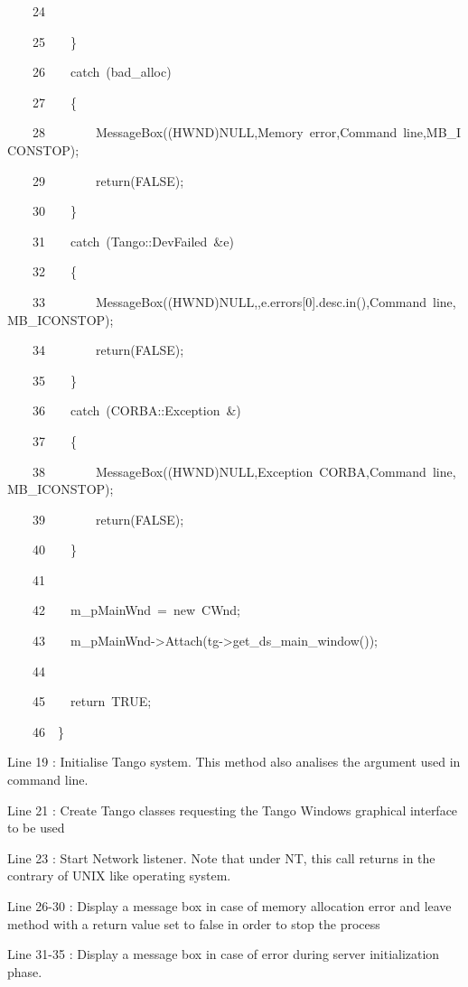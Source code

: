 \begin{lyxcode}
~~~~24~~

~~~~25~~~~\}

~~~~26~~~~catch~(bad\_alloc)

~~~~27~~~~\{

~~~~28~~~~~~~~MessageBox((HWND)NULL,\textquotedbl{}Memory~error\textquotedbl{},\textquotedbl{}Command~line\textquotedbl{},MB\_ICONSTOP);

~~~~29~~~~~~~~return(FALSE);

~~~~30~~~~\}

~~~~31~~~~catch~(Tango::DevFailed~\&e)

~~~~32~~~~\{

~~~~33~~~~~~~~MessageBox((HWND)NULL,,e.errors{[}0{]}.desc.in(),\textquotedbl{}Command~line\textquotedbl{},MB\_ICONSTOP);

~~~~34~~~~~~~~return(FALSE);

~~~~35~~~~\}

~~~~36~~~~catch~(CORBA::Exception~\&)

~~~~37~~~~\{

~~~~38~~~~~~~~MessageBox((HWND)NULL,\textquotedbl{}Exception~CORBA\textquotedbl{},\textquotedbl{}Command~line\textquotedbl{},MB\_ICONSTOP);

~~~~39~~~~~~~~return(FALSE);

~~~~40~~~~\}

~~~~41~~

~~~~42~~~~m\_pMainWnd~=~new~CWnd;

~~~~43~~~~m\_pMainWnd->Attach(tg->get\_ds\_main\_window());

~~~~44~~

~~~~45~~~~return~TRUE;

~~~~46~~\}
\end{lyxcode}


Line 19 : Initialise Tango system. This method also analises the argument
used in command line.

Line 21 : Create Tango classes requesting the Tango Windows graphical
interface to be used

Line 23 : Start Network listener. Note that under NT, this call returns
in the contrary of UNIX like operating system.

Line 26-30 : Display a message box in case of memory allocation error
and leave method with a return value set to false in order to stop
the process

Line 31-35 : Display a message box in case of error during server
initialization phase.

